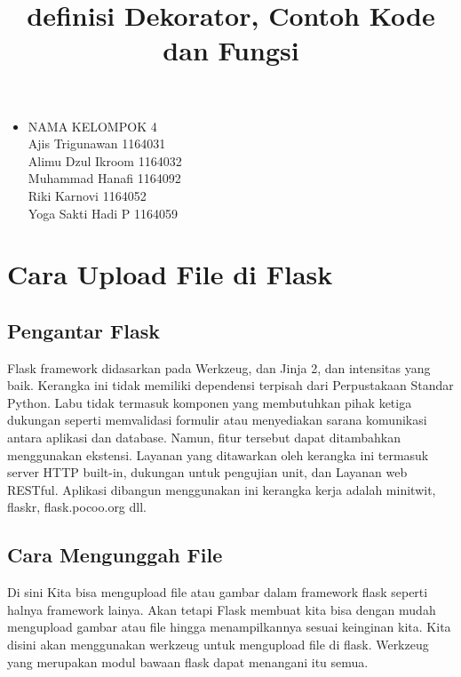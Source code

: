 \documentclass[12pt,a4paper]{article}
\begin{document}
\title{definisi Dekorator, Contoh Kode dan Fungsi}
\maketitle

\begin{itemize}

\item
NAMA KELOMPOK 4\\
Ajis Trigunawan			1164031\\
Alimu Dzul Ikroom		1164032\\
Muhammad Hanafi			1164092\\
Riki Karnovi			1164052\\
Yoga Sakti Hadi P		1164059\\

\end{itemize}

\section{Cara Upload File di Flask}

\subsection{Pengantar Flask}

Flask framework didasarkan pada Werkzeug, dan Jinja 2, dan intensitas yang baik. Kerangka ini tidak memiliki dependensi terpisah dari
Perpustakaan Standar Python. Labu tidak termasuk komponen yang membutuhkan pihak ketiga dukungan seperti memvalidasi formulir atau menyediakan sarana komunikasi antara aplikasi dan database. Namun, fitur tersebut dapat ditambahkan menggunakan ekstensi. Layanan yang ditawarkan oleh kerangka ini termasuk server HTTP built-in, dukungan untuk pengujian unit, dan Layanan web RESTful. Aplikasi dibangun menggunakan ini kerangka kerja adalah minitwit, flaskr, flask.pocoo.org dll.

\subsection{Cara Mengunggah File}


Di sini Kita bisa mengupload file atau gambar dalam framework flask seperti halnya framework lainya. Akan tetapi Flask membuat kita bisa dengan mudah mengupload gambar atau file hingga menampilkannya sesuai keinginan kita. Kita disini akan menggunakan werkzeug untuk mengupload file di flask. Werkzeug yang merupakan modul bawaan flask dapat menangani itu semua.
\end{document}
